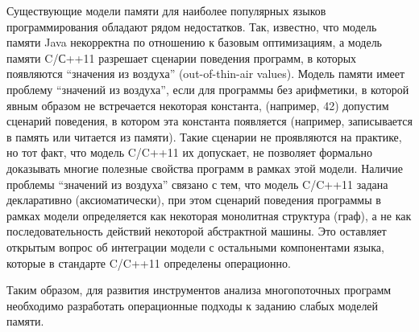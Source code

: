 Существующие модели памяти для наиболее популярных языков программирования обладают рядом недостатков.
Так, известно, что модель памяти Java некорректна по отношению
к базовым оптимизациям, а модель памяти C/С++11 разрешает
сценарии поведения программ, в которых появляются ``значения из воздуха'' (out-of-thin-air values).
Модель памяти имеет проблему ``значений из воздуха'', если для программы без арифметики,
в которой явным образом не встречается некоторая константа, (например, 42) допустим сценарий поведения,
в котором эта константа появляется (например, записывается в память или читается из памяти).
Такие сценарии не проявляются на практике, но тот факт,
что модель C/C++11 их допускает, не позволяет формально доказывать многие полезные свойства программ в рамках этой модели.
Наличие проблемы ``значений из воздуха'' связано с тем, что модель C/C++11 задана декларативно (аксиоматически), при этом сценарий поведения программы
в рамках модели определяется как некоторая монолитная структура (граф), а не как последовательность действий некоторой
абстрактной машины.
Это оставляет открытым вопрос об интеграции модели с остальными компонентами языка, которые в стандарте C/C++11 определены
операционно.

Таким образом, для развития инструментов анализа многопоточных программ необходимо
разработать операционные подходы к заданию слабых моделей памяти.



